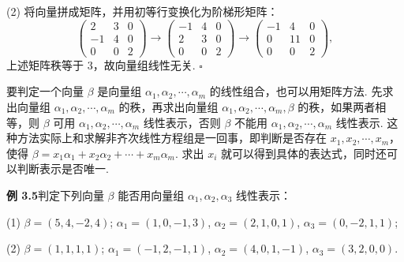 \documentclass[UTF8,12pt,a4paper,fontset=fandol]{ctexart}
\begin{document}
(2) 将向量拼成矩阵，并用初等行变换化为阶梯形矩阵：
\[
\begin{pmatrix}
2 & 3 & 0\\
-1 & 4 & 0\\
0 & 0 & 2
\end{pmatrix}
\to
\begin{pmatrix}
-1 & 4 & 0\\
2 & 3 & 0\\
0 & 0 & 2
\end{pmatrix}
\to
\begin{pmatrix}
-1 & 4 & 0\\
0 & 11 & 0\\
0 & 0 & 2
\end{pmatrix},
\]
上述矩阵秩等于 3，故向量组线性无关. $\square$

要判定一个向量 $\beta$ 是向量组 $\alpha_1,\alpha_2,\cdots,\alpha_m$ 的线性组合，也可以用矩阵方法. 先求出向量组 $\alpha_1,\alpha_2,\cdots,\alpha_m$ 的秩，再求出向量组 $\alpha_1,\alpha_2,\cdots,\alpha_m,\beta$ 的秩，如果两者相等，则 $\beta$ 可用 $\alpha_1,\alpha_2,\cdots,\alpha_m$ 线性表示，否则 $\beta$ 不能用 $\alpha_1,\alpha_2,\cdots,\alpha_m$ 线性表示. 这种方法实际上和求解非齐次线性方程组是一回事，即判断是否存在 $x_1,x_2,\cdots,x_m$，使得 $\beta=x_1\alpha_1+x_2\alpha_2+\cdots+x_m\alpha_m$. 求出 $x_i$ 就可以得到具体的表达式，同时还可以判断表示是否唯一.

\noindent\textbf{例 3.5}\quad 判定下列向量 $\beta$ 能否用向量组 $\alpha_1,\alpha_2,\alpha_3$ 线性表示：

(1) $\beta=(5,4,-2,4)$; $\alpha_1=(1,0,-1,3)$, $\alpha_2=(2,1,0,1)$, $\alpha_3=(0,-2,1,1)$;

(2) $\beta=(1,1,1,1)$; $\alpha_1=(-1,2,-1,1)$, $\alpha_2=(4,0,1,-1)$, $\alpha_3=(3,2,0,0)$.
\end{document}
